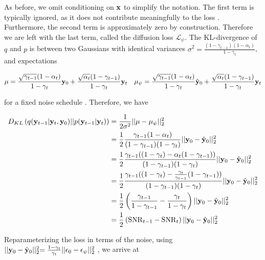 As before, we omit conditioning on $\bold{x}$ to simplify the notation. The first term is typically ignored, as it does not contribute meaningfully to the loss \parencite{Ribeiro2024}. Furthermore, the second term is approximately zero by construction. Therefore we are left with the last term, called the diffusion loss $\mathcal{L}_{\psi}$. The KL-divergence of $q$ and $p$ is between two Gaussians with identical variances $\sigma^{2} = \frac{(1-\gamma_{t-1})(1-\alpha_{t})}{1-\gamma_{t}}$, and expectations

\begin{align*}
\mu = \frac{\sqrt{\gamma_{t-1}}(1-\alpha_{t})}{1-\gamma_{t}}\bold{y}_{0}+ \frac{\sqrt{\alpha_{t}}(1-\gamma_{t-1})}{{1-\gamma_{t}}}\bold{y}_{t} \quad \mu_{\psi} = \frac{\sqrt{\gamma_{t-1}}(1-\alpha_{t})}{1-\gamma_{t}}\hat{\bold{y}}_{0}+ \frac{\sqrt{\alpha_{t}}(1-\gamma_{t-1})}{{1-\gamma_{t}}}\bold{y}_{t}
\end{align*}

for a fixed noise schedule \parencite{Saharia2021}. Therefore, we have

\begin{align*}
D_{KL}\left(q(\bold{y}_{t-1}\lvert\bold{y}_t,\bold{y}_0)\lvert\lvert p(\bold{y}_{t-1}\lvert\bold{y}_t) \right) &= \frac{1}{2\sigma^{2}} \lvert\lvert \mu - \mu_{\psi} \lvert\lvert_{2}^{2} \\
&= \frac{1}{2}\frac{\gamma_{t-1}(1-\alpha_{t})}{(1-\gamma_{t-1})(1-\gamma_{t})}\lvert\lvert \bold{y}_{0} - \hat{\bold{y}}_{0} \lvert\lvert_{2}^{2}\\
&= \frac{1}{2}\frac{\gamma_{t-1}((1-\gamma_{t})-\alpha_{t}(1-\gamma_{t-1}))}{(1-\gamma_{t-1})(1-\gamma_{t})}\lvert\lvert \bold{y}_{0} - \hat{\bold{y}}_{0} \lvert\lvert_{2}^{2}\\
&= \frac{1}{2}\frac{\gamma_{t-1}((1-\gamma_{t})-\frac{\gamma_{t}}{\gamma_{t-1}}(1-\gamma_{t-1}))}{(1-\gamma_{t-1})(1-\gamma_{t})}\lvert\lvert \bold{y}_{0} - \hat{\bold{y}}_{0} \lvert\lvert_{2}^{2}\\
&= \frac{1}{2}\left(\frac{\gamma_{t-1}}{1-\gamma_{t-1}}-\frac{\gamma_{t}}{1-\gamma_{t}}\right)\lvert\lvert \bold{y}_{0} - \hat{\bold{y}}_{0} \lvert\lvert_{2}^{2}\\
&= \frac{1}{2}\left(\mathrm{SNR}_{t-1}-\mathrm{SNR}_{t}\right)\lvert\lvert \bold{y}_{0} - \hat{\bold{y}}_{0} \lvert\lvert_{2}^{2}
\end{align*}

Reparameterizing the loss in terms of the noise, using $\lvert\lvert \bold{y}_{0} - \hat{\bold{y}}_{0} \lvert\lvert_{2}^{2} = \frac{1-\gamma_{t}}{\gamma_{t}}\lvert\lvert \bold{\epsilon}_{0} - \epsilon_{\psi} \lvert\lvert_{2}^{2}$ \parencite{Ribeiro2024}, we arrive at 

